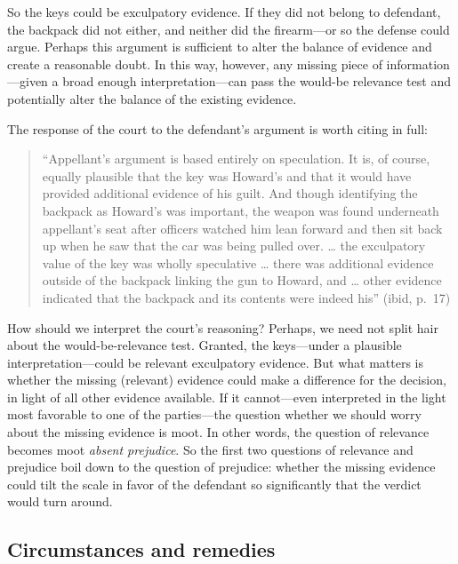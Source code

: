 \documentclass[
  10pt,
  dvipsnames,enabledeprecatedfontcommands]{scrartcl}
\begin{document}
\noindent So the keys could be exculpatory evidence. If they did not
belong to defendant, the backpack did not either, and neither did the
firearm---or so the defense could argue. Perhaps this argument is
sufficient to alter the balance of evidence and create a reasonable
doubt. In this way, however, any missing piece of information---given a
broad enough interpretation---can pass the would-be relevance test and
potentially alter the balance of the existing evidence.

The response of the court to the defendant's argument is worth citing in
full:

\begin{quote}
``Appellant's argument is based entirely on speculation. It is, of
course, equally plausible that the key was Howard's and that it would
have provided additional evidence of his guilt. And though identifying
the backpack as Howard's was important, the weapon was found underneath
appellant's seat after officers watched him lean forward and then sit
back up when he saw that the car was being pulled over. \ldots{} the
exculpatory value of the key was wholly speculative \ldots{} there was
additional evidence outside of the backpack linking the gun to Howard,
and \ldots{} other evidence indicated that the backpack and its contents
were indeed his'' (ibid, p.~17)
\end{quote}

\noindent How should we interpret the court's reasoning? Perhaps, we
need not split hair about the would-be-relevance test. Granted, the
keys---under a plausible interpretation---could be relevant exculpatory
evidence. But what matters is whether the missing (relevant) evidence
could make a difference for the decision, in light of all other evidence
available. If it cannot---even interpreted in the light most favorable
to one of the parties---the question whether we should worry about the
missing evidence is moot. In other words, the question of relevance
becomes moot \emph{absent prejudice}. So the first two questions of
relevance and prejudice boil down to the question of prejudice: whether
the missing evidence could tilt the scale in favor of the defendant so
significantly that the verdict would turn around.

\hypertarget{circumstances-and-remedies}{%
\subsection{Circumstances and
remedies}\label{circumstances-and-remedies}}
\end{document}
